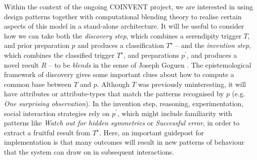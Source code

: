 Within the context of the ongoing COINVENT project, we are interested
in using design patterns together with computational blending theory
to realise certain aspects of this model in a stand-alone
architecture.
%
It will be useful to consider how we can take both the \emph{discovery
  step}, which combines a serendipity trigger $T$, and prior
preparation $p$ and produces a classification $T^{\star}$ -- and the
\emph{invention step}, which combines the classified trigger
$T^{\star}$, and preparations $p^{\prime}$, and produces a novel
result $R$ -- to be \emph{blends} in the sense of Joseph Goguen
\cite{goguen1999introduction}.  The epistemological framework of
discovery gives some important clues about how to compute a common
base between $T$ and $p$.  Although $T$ was previously uninteresting,
it will have attributes or attribute-types that match the patterns
recognised by $p$ (e.g. \emph{One surprising observation}).  In the
invention step, reasoning, experimentation, social interaction
strategies rely on $p^{\prime}$, which might include familiarity with
patterns like \emph{Watch out for hidden symmetries} or
\emph{Successful error}, in order to extract a fruitful result from
$T^{\star}$.  Here, an important guidepost for implementation is that
many outcomes will result in new patterns of behaviour that the system
can draw on in subsequent interactions.

